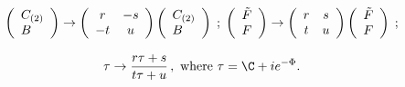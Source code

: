 \begin{equation}
\label{S-transf}
\begin{array}{c}
\left(\begin{array}{l} C_{(2)} \\ B \end{array}\right) \to
\left(\begin{array}{cc} r & -s \\ -t & u \end{array}\right)
\left(\begin{array}{l} C_{(2)} \\ B \end{array}\right)\;;\;
\left(\begin{array}{l} \tilde{F} \\ F \end{array}\right) \to
\left(\begin{array}{cc} r & s \\ t & u \end{array}\right)
\left(\begin{array}{l} \tilde{F} \\ F \end{array}\right)\;;
\\ \\
\displaystyle \tau \to \frac{r\tau+s}{t\tau+u}\,,
\text{ where } \tau = \C + ie^{-\Phi}.
\end{array}
\end{equation}

